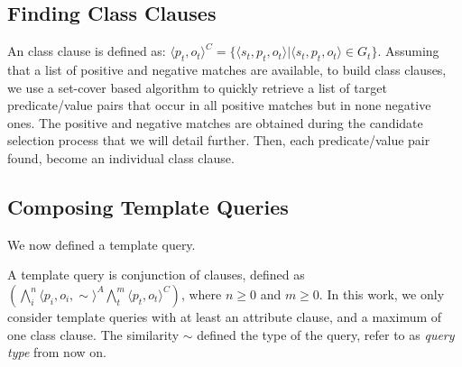 
\subsection{Finding Class Clauses}
 
An class clause is defined as: $\langle p_t,o_t \rangle^C=\{\langle s_t,p_t,o_t \rangle | \langle s_t,p_t,o_t \rangle \in G_t \}$.  Assuming that a list of positive and negative matches are available, to build class clauses, we use a set-cover based algorithm \cite{DBLP:conf/soda/CarrDKM00} to quickly retrieve a list of target predicate/value pairs that occur in all positive matches but in none negative ones. The positive and negative matches are obtained during the candidate selection process that we will detail further. Then, each predicate/value pair found, become an individual class clause.

\subsection{Composing Template Queries} 

We now defined a template query. 

\begin{definition}   A template query is conjunction of clauses, defined as $( \bigwedge_{i}^n\langle p_i,o_i,\sim \rangle^A   \bigwedge_{t}^m\langle p_t,o_t \rangle^C)$, where $n\geq0$ and $m\geq0$. In this work, we only consider template queries with at least an attribute clause, and a maximum of one class clause. The similarity $\sim$ defined the type of the query, refer to as \textit{query type} from now on.
 \end{definition} 

